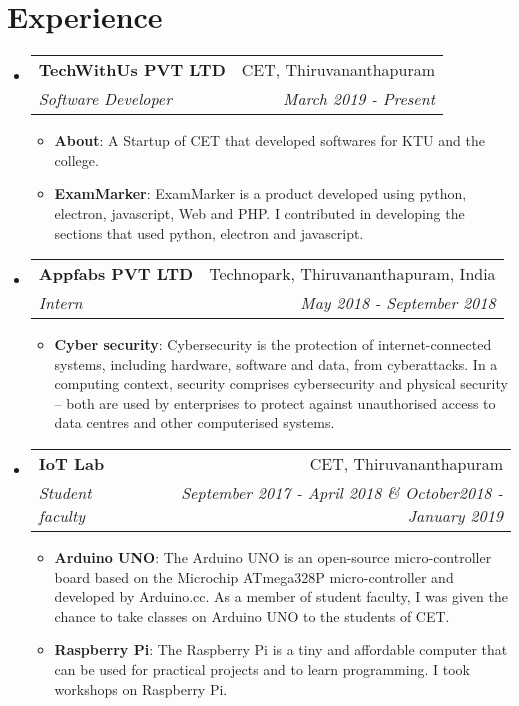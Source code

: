 \documentclass[letterpaper,11pt]{article}
\makeatletter
\newcommand{\resumeItem}[2]{
	\item\small{
    		\textbf{#1}{: #2 \vspace{-2pt}}
  	}
}
\newcommand{\resumeSubheading}[4]{
  	\vspace{-1pt}\item
    	\begin{tabular*}{0.97\textwidth}[t]{l@{\extracolsep{\fill}}r}
      		\textbf{#1} & #2 \\
      		\textit{\small#3} & \textit{\small #4} \\
    	\end{tabular*}\vspace{-5pt}
}
\newcommand{\resumeSubHeadingListStart}{\begin{itemize}[leftmargin=*]}
\newcommand{\resumeSubHeadingListEnd}{\end{itemize}}
\newcommand{\resumeItemListStart}{\begin{itemize}}
\newcommand{\resumeItemListEnd}{\end{itemize}\vspace{-5pt}}
\makeatother
\begin{document}
\section{Experience}
  	\resumeSubHeadingListStart
  	\resumeSubheading
      		{TechWithUs PVT LTD}{CET, Thiruvananthapuram}
      		{Software Developer}{March 2019 - Present}
      		\resumeItemListStart
			\resumeItem{About}
				{A Startup of CET that developed softwares for KTU and the college.}
        			\resumeItem{ExamMarker}
          			{ExamMarker is a product developed using python, electron, javascript, Web and PHP. I contributed in developing the sections that used python, electron and javascript.}
      		\resumeItemListEnd
    	\resumeSubheading
      		{Appfabs PVT LTD}{Technopark, Thiruvananthapuram, India}
      		{Intern}{May 2018 - September 2018}
      		\resumeItemListStart
        			\resumeItem{Cyber security}
          			{Cybersecurity is the protection of internet-connected systems, including hardware, software and data, from cyberattacks. In a computing context, security comprises cybersecurity and physical security -- both are used by enterprises to protect against unauthorised access to data centres and other computerised systems.}
      		\resumeItemListEnd
		\resumeSubheading
      		{IoT Lab}{CET, Thiruvananthapuram}
      		{Student faculty}{September 2017 - April 2018 \& October2018 - January 2019}
      		\resumeItemListStart
        			\resumeItem{Arduino UNO}
          			{The Arduino UNO is an open-source micro-controller board based on the Microchip ATmega328P micro-controller and developed by Arduino.cc. As a member of student faculty, I was given the chance to take classes on Arduino UNO to the students of CET.}
        			\resumeItem{Raspberry Pi}
          			{The Raspberry Pi is a tiny and affordable computer that can be used for practical projects and to learn programming. I took workshops on Raspberry Pi.}
      		\resumeItemListEnd
  	\resumeSubHeadingListEnd

\end{document}
